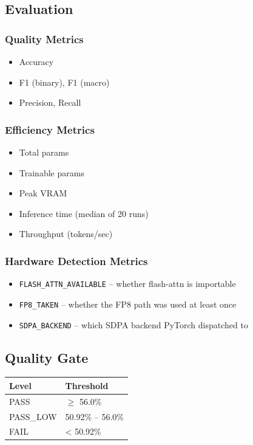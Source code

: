 \subsection{Evaluation}

\subsubsection{Quality Metrics}

\begin{itemize}
\item Accuracy
\item F1 (binary), F1 (macro)
\item Precision, Recall

\end{itemize}
\subsubsection{Efficiency Metrics}

\begin{itemize}
\item Total params
\item Trainable params
\item Peak VRAM
\item Inference time (median of 20 runs)
\item Throughput (tokens/sec)

\end{itemize}
\subsubsection{Hardware Detection Metrics}

\begin{itemize}
\item \texttt{FLASH\_ATTN\_AVAILABLE} -- whether flash-attn is importable
\item \texttt{FP8\_TAKEN} -- whether the FP8 path was used at least once
\item \texttt{SDPA\_BACKEND} -- which SDPA backend PyTorch dispatched to

\end{itemize}
\subsection{Quality Gate}

\begin{table}[H]
\centering
\small
\begin{tabular}{ll}
\toprule
\textbf{Level} & \textbf{Threshold} \\
\midrule
PASS & $\ge$ 56.0\% \\
PASS\_LOW & 50.92\% -- 56.0\% \\
FAIL & < 50.92\% \\
\bottomrule
\end{tabular}
\end{table}

